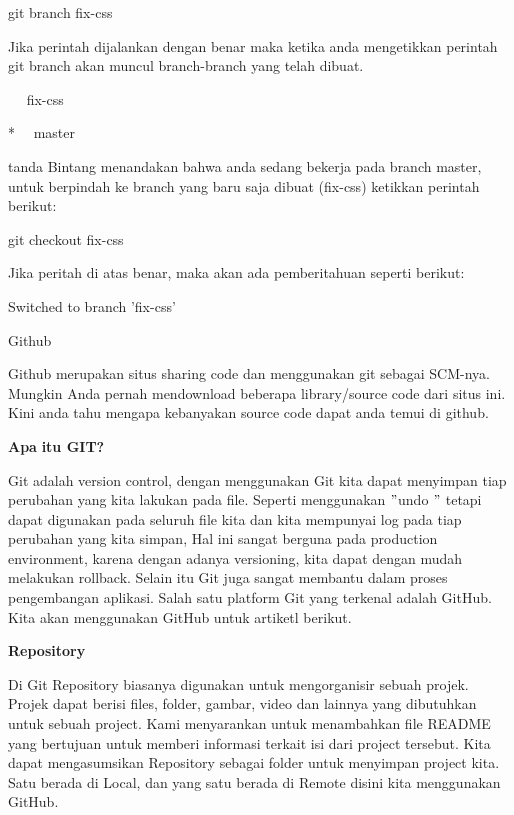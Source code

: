 \noindent 
 \hspace*{0.5in} git branch fix-css \par
\noindent 
Jika perintah dijalankan dengan benar maka ketika anda mengetikkan perintah git branch akan muncul branch-branch yang telah dibuat. \par
\noindent 
 \hspace*{0.5in} ~~ fix-css \par
\noindent 
 \hspace*{0.5in} *~~ master \par
\noindent 
tanda Bintang menandakan bahwa anda sedang bekerja pada branch master, untuk berpindah ke branch yang baru saja dibuat (fix-css) ketikkan perintah berikut: \par
\noindent 
 \hspace*{0.5in} git checkout fix-css \par
\noindent 
Jika peritah di atas benar, maka akan ada pemberitahuan seperti berikut: \par
\noindent 
 \hspace*{0.5in} Switched to branch 'fix-css' \par
\noindent 
Github  \par
\noindent 
Github merupakan situs sharing code dan menggunakan git sebagai SCM-nya. Mungkin Anda pernah mendownload beberapa library/source code dari situs ini. Kini anda tahu mengapa kebanyakan source code dapat anda temui di github. \par
\vspace{12pt}
\noindent 
{\fontsize{14pt}{14pt}\selectfont \textbf{Apa}\textbf{ itu GIT?} \\} \par
\noindent 
Git adalah version control, dengan menggunakan Git kita dapat menyimpan tiap perubahan yang kita lakukan pada file. Seperti menggunakan  $ " $undo $ " $ tetapi dapat digunakan pada seluruh file kita dan kita mempunyai log pada tiap perubahan yang kita simpan, Hal ini sangat berguna pada production environment, karena dengan adanya versioning, kita dapat dengan mudah melakukan rollback. Selain itu Git juga sangat membantu dalam proses pengembangan aplikasi. Salah satu platform Git yang terkenal adalah GitHub. Kita akan menggunakan GitHub untuk artiketl berikut. \par
\vspace{12pt}
\noindent 
{\fontsize{14pt}{14pt}\selectfont \textbf{Repository} \\} \par
\noindent 
Di Git Repository biasanya digunakan untuk mengorganisir sebuah projek. Projek dapat berisi files, folder, gambar, video dan lainnya yang dibutuhkan untuk sebuah project. Kami menyarankan untuk menambahkan file README yang bertujuan untuk memberi informasi terkait isi dari project tersebut. Kita dapat mengasumsikan Repository sebagai folder untuk menyimpan project kita. Satu berada di Local, dan yang satu berada di Remote disini kita menggunakan GitHub. \par
